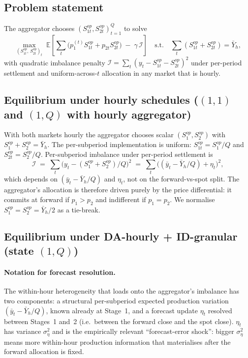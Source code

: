 \documentclass[11pt]{article}
\begin{document}
\subsection{Problem statement}\label{app:aggregator:problem}
The aggregator chooses $(S^{op}_{1t}, S^{op}_{2t})_{t=1}^{Q}$ to solve
\begin{equation}
\max_{(S^{op}_{1t},\, S^{op}_{2t})_t}\;
\mathbb{E}\!\left[\sum_t \big(p_1^{(t)} S^{op}_{1t} + p_{2t} S^{op}_{2t}\big) \;-\; \gamma\,\mathcal{I}\right]
\quad\text{s.t.}\quad \sum_t (S^{op}_{1t} + S^{op}_{2t}) = \bar Y_h,
\label{eq:agg-problem}
\end{equation}
with quadratic imbalance penalty $\mathcal{I} = \sum_t (y_t - S^{op}_{1t} - S^{op}_{2t})^2$ under per-period settlement and uniform-across-$t$ allocation in any market that is hourly.

\subsection{Equilibrium under hourly schedules ($(1,1)$ and $(1,Q)$ with hourly aggregator)}\label{app:aggregator:hourly}
With both markets hourly the aggregator chooses scalar $(S^{op}_1, S^{op}_2)$ with $S^{op}_1 + S^{op}_2 = \bar Y_h$. The per-subperiod implementation is uniform: $S^{op}_{1t} = S^{op}_1/Q$ and $S^{op}_{2t} = S^{op}_2/Q$. Per-subperiod imbalance under per-period settlement is
\[
\mathcal{I} \;=\; \sum_t \big(y_t - (S^{op}_1 + S^{op}_2)/Q\big)^2 \;=\; \sum_t \big((\bar y_t - \bar Y_h/Q) + \eta_t\big)^2,
\]
which depends on $(\bar y_t - \bar Y_h/Q)$ and $\eta_t$, not on the forward-vs-spot split. The aggregator's allocation is therefore driven purely by the price differential: it commits at forward if $p_1 > p_2$ and indifferent if $p_1 = p_2$. We normalise $S^{op}_1 = S^{op}_2 = \bar Y_h / 2$ as a tie-break.

\subsection{Equilibrium under DA-hourly + ID-granular (state $(1,Q)$)}\label{app:aggregator:60-15}

\paragraph{Notation for forecast resolution.} The within-hour heterogeneity that loads onto the aggregator's imbalance has two components: a structural per-subperiod expected production variation $(\bar y_t - \bar Y_h/Q)$, known already at Stage~1, and a forecast update $\eta_t$ resolved between Stages~1 and~2 (i.e.\ between the forward close and the spot close). $\eta_t$ has variance $\sigma_\eta^2$ and is the empirically relevant ``forecast-error shock'': bigger $\sigma_\eta^2$ means more within-hour production information that materialises after the forward allocation is fixed.
\end{document}
